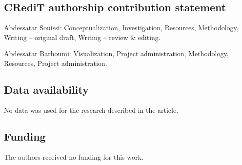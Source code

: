 \documentclass[12pt,a4paper]{article}
\begin{document}
\subsection*{CRediT authorship contribution statement}

Abdessatar Souissi: Conceptualization, Investigation, Resources, Methodology, Writing – original draft, Writing – review \& editing.

Abdessatar Barhoumi: Visualization, Project administration, Methodology, Resources, Project administration.



\subsection*{Data availability}

No data was used for the research described in the article.

 
\subsection*{Funding}
The authors received no funding for this work.
\end{document}
